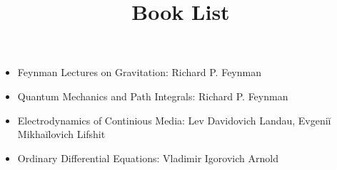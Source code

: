 \documentclass{article}
\newenvironment{itemizedot}{\begin{itemize} \renewcommand{\labelitemi}{$\bullet$}\renewcommand{\labelitemii}{$\bullet$}\renewcommand{\labelitemiii}{$\bullet$}\renewcommand{\labelitemiv}{$\bullet$}}{\end{itemize}}
\begin{document}
\title{Book List}

\maketitle
\begin{itemizedot}
  \item Feynman Lectures on Gravitation: Richard P. Feynman
  
  \item Quantum Mechanics and Path Integrals: Richard P. Feynman
  
  \item Electrodynamics of Continious Media: Lev Davidovich Landau, Evgeniĭ
  Mikhaĭlovich Lifshit
  
  \item Ordinary Differential Equations: Vladimir Igorovich Arnold
  
  \ 
\end{itemizedot}
\end{document}
